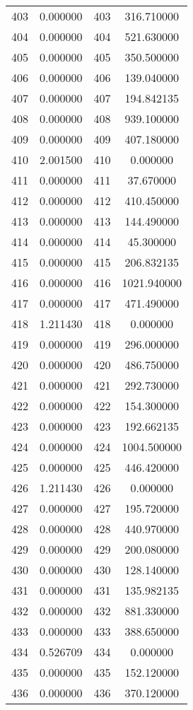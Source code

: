 \documentclass[12pt]{article}
\begin{document}
\begin{longtable}{@{}cccc@{}}
403 & 0.000000 & 403 & 316.710000 \\
404 & 0.000000 & 404 & 521.630000 \\
405 & 0.000000 & 405 & 350.500000 \\
406 & 0.000000 & 406 & 139.040000 \\
407 & 0.000000 & 407 & 194.842135 \\
408 & 0.000000 & 408 & 939.100000 \\
409 & 0.000000 & 409 & 407.180000 \\
410 & 2.001500 & 410 & 0.000000 \\
411 & 0.000000 & 411 & 37.670000 \\
412 & 0.000000 & 412 & 410.450000 \\
413 & 0.000000 & 413 & 144.490000 \\
414 & 0.000000 & 414 & 45.300000 \\
415 & 0.000000 & 415 & 206.832135 \\
416 & 0.000000 & 416 & 1021.940000 \\
417 & 0.000000 & 417 & 471.490000 \\
418 & 1.211430 & 418 & 0.000000 \\
419 & 0.000000 & 419 & 296.000000 \\
420 & 0.000000 & 420 & 486.750000 \\
421 & 0.000000 & 421 & 292.730000 \\
422 & 0.000000 & 422 & 154.300000 \\
423 & 0.000000 & 423 & 192.662135 \\
424 & 0.000000 & 424 & 1004.500000 \\
425 & 0.000000 & 425 & 446.420000 \\
426 & 1.211430 & 426 & 0.000000 \\
427 & 0.000000 & 427 & 195.720000 \\
428 & 0.000000 & 428 & 440.970000 \\
429 & 0.000000 & 429 & 200.080000 \\
430 & 0.000000 & 430 & 128.140000 \\
431 & 0.000000 & 431 & 135.982135 \\
432 & 0.000000 & 432 & 881.330000 \\
433 & 0.000000 & 433 & 388.650000 \\
434 & 0.526709 & 434 & 0.000000 \\
435 & 0.000000 & 435 & 152.120000 \\
436 & 0.000000 & 436 & 370.120000 \\

\end{longtable}
\end{document}

